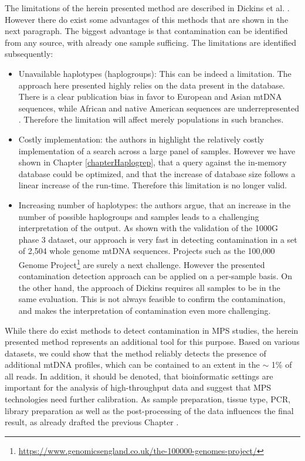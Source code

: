 The limitations of the herein presented method are described in Dickins et al. \cite{Dickins2014}. However there do exist some advantages of this methods that are shown in the next paragraph. The biggest advantage is that contamination can be identified from any source, with already one sample sufficing. The limitations are identified subsequently:
\begin{itemize}
\item Unavailable haplotypes (haplogroups): This can be indeed a limitation. The approach here presented highly relies on the data present in the database. There is a clear publication bias in favor to European and Asian mtDNA sequences, while African and native American sequences are underrepresented \cite{Fendt2011}. Therefore the limitation will affect merely populations in such branches. 
\item Costly implementation: the authors in \cite{Dickins2014} highlight the relatively costly implementation of a search across a large panel of samples. However we have shown in Chapter \ref{chapterHaplogrep}, that a query against the in-memory database could be optimized, and that the increase of database size follows a linear increase of the run-time. Therefore this limitation is no longer valid.
\item Increasing number of haplotypes: the authors argue, that an increase in the number of possible haplogroups and samples leads to a challenging interpretation of the output. As shown with the validation of the 1000G phase 3 dataset, our approach is very fast in detecting contamination in a set of 2,504 whole genome mtDNA sequences. Projects such as the 100,000 Genome Project\footnote{\url{https://www.genomicsengland.co.uk/the-100000-genomes-project/}} are surely a next challenge. However the presented  contamination detection approach can be applied on a per-sample basis. On the other hand, the approach of Dickins requires all samples to be in the same evaluation. This is not always feasible to confirm the contamination, and makes the interpretation of contamination even more challenging. 
\end{itemize}

While there do exist methods to detect contamination in MPS studies, the herein presented method represents an additional tool for this purpose. Based on various datasets, we could show that the method reliably detects the presence of additional mtDNA profiles, which can be contained to an extent in the $\sim$ 1\% of all reads. 
In addition, it should be denoted, that bioinformatic settings are important for the analysis of high-throughput data and suggest that MPS technologies need further calibration. As sample preparation, tissue type, PCR, library preparation as well as the post-processing of the data influences the final result, as already drafted the previous Chapter \cite{chap:NGS}.


